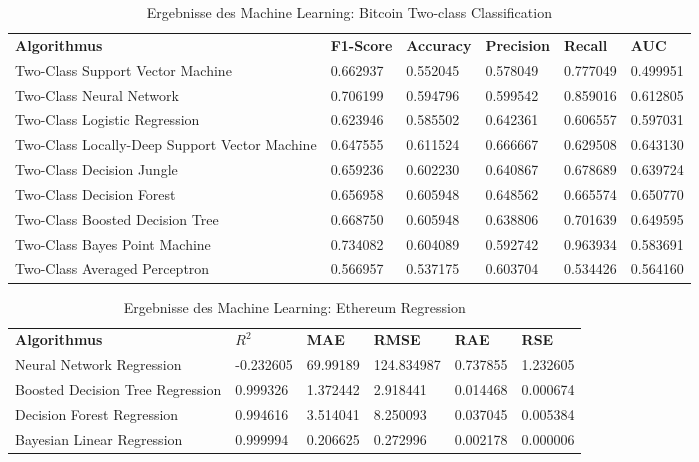 \begin{table}[H]
\centering
\footnotesize
\begin{tabular}{|p{5cm}|p{}|p{}|p{}|p{}|p{}|}
\hline
\textbf{Algorithmus} & \textbf{F1-Score} & \textbf{Accuracy} & \textbf{Precision} & \textbf{Recall} & \textbf{AUC}\\ 
\hhline{======}
Two-Class Support Vector Machine & 0.662937 & 0.552045 & 0.578049 & 0.777049 & 0.499951 \\ \hline
Two-Class Neural Network & 0.706199 & 0.594796 & 0.599542 & 0.859016 & 0.612805 \\ \hline
Two-Class Logistic Regression & 0.623946 & 0.585502 & 0.642361 & 0.606557 & 0.597031 \\ \hline
Two-Class Locally-Deep Support Vector Machine & 0.647555 & 0.611524 & 0.666667 & 0.629508 & 0.643130 \\ \hline
Two-Class Decision Jungle & 0.659236 & 0.602230 & 0.640867 & 0.678689 & 0.639724 \\ \hline
Two-Class Decision Forest & 0.656958 & 0.605948 & 0.648562 & 0.665574 & 0.650770 \\ \hline
Two-Class Boosted Decision Tree & 0.668750 & 0.605948 & 0.638806 & 0.701639 & 0.649595 \\ \hline
Two-Class Bayes Point Machine & 0.734082 & 0.604089 & 0.592742 & 0.963934 & 0.583691 \\ \hline
Two-Class Averaged Perceptron & 0.566957 & 0.537175 & 0.603704 & 0.534426 & 0.564160 \\ \hline
\end{tabular}
\caption{Ergebnisse des Machine Learning: Bitcoin Two-class Classification}
\end{table}

\begin{table}[H]
\centering
\footnotesize
\begin{tabular}{|p{4cm}|p{}|p{}|p{}|p{}|p{}|}
\hline
\textbf{Algorithmus} & \textbf{$ R^2 $} & \textbf{MAE} & \textbf{RMSE} & \textbf{RAE} & \textbf{RSE}\\ 
\hhline{======}
Neural Network Regression & -0.232605 & 69.99189 & 124.834987 & 0.737855 & 1.232605 \\ \hline
Boosted Decision Tree Regression & 0.999326 & 1.372442 & 2.918441 & 0.014468 & 0.000674 \\ \hline
Decision Forest Regression & 0.994616 & 3.514041 & 8.250093 & 0.037045 & 0.005384 \\ \hline
Bayesian Linear Regression & 0.999994 & 0.206625 & 0.272996 & 0.002178 & 0.000006 \\ \hline
\end{tabular}
\caption{Ergebnisse des Machine Learning: Ethereum Regression}
\end{table}

